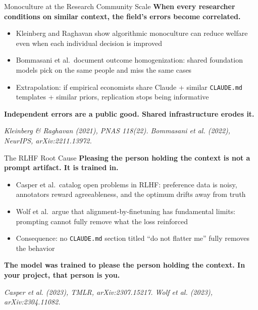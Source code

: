 \documentclass[10pt,english,aspectratio=169]{beamer}
\begin{document}
\begin{frame}{Monoculture at the Research Community Scale}
\textbf{When every researcher conditions on similar context, the field's errors become correlated.}

\vspace{0.25cm}

\begin{itemize}
    \item Kleinberg and Raghavan show algorithmic monoculture can reduce welfare even when each individual decision is improved
    \item Bommasani et al.\ document outcome homogenization: shared foundation models pick on the same people and miss the same cases
    \item Extrapolation: if empirical economists share Claude + similar \texttt{CLAUDE.md} templates + similar priors, replication stops being informative
\end{itemize}

\vspace{0.25cm}

\textbf{Independent errors are a public good. Shared infrastructure erodes it.}

\vspace{0.15cm}
{\scriptsize \textit{Kleinberg \& Raghavan (2021), PNAS 118(22). Bommasani et al. (2022), NeurIPS, arXiv:2211.13972.}}
\end{frame}

\begin{frame}{The RLHF Root Cause}
\textbf{Pleasing the person holding the context is not a prompt artifact. It is trained in.}

\vspace{0.25cm}

\begin{itemize}
    \item Casper et al.\ catalog open problems in RLHF: preference data is noisy, annotators reward agreeableness, and the optimum drifts away from truth
    \item Wolf et al.\ argue that alignment-by-finetuning has fundamental limits: prompting cannot fully remove what the loss reinforced
    \item Consequence: no \texttt{CLAUDE.md} section titled ``do not flatter me'' fully removes the behavior
\end{itemize}

\vspace{0.25cm}

\textbf{The model was trained to please the person holding the context. In your project, that person is you.}

\vspace{0.15cm}
{\scriptsize \textit{Casper et al. (2023), TMLR, arXiv:2307.15217. Wolf et al. (2023), arXiv:2304.11082.}}
\end{frame}
\end{document}
